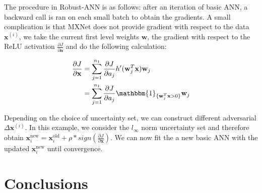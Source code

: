 \documentclass[twoside,12pt]{article}
\newcommand{\M}[1]{\boldsymbol{\mathbf{#1}}}
\begin{document}
The procedure in Robust-ANN is as follows: after an iteration of basic ANN, a backward call is ran on each small batch to obtain the gradients. A small complication is that \textsf{MXNet} does not provide gradient with respect to the data $\M x^{(i)}$, we take the current first level weights $\M w$, the gradient with respect to the ReLU activation $\frac{\partial J}{\partial \M a}$ and do the following calculation:


\begin{equation}
\begin{aligned}
\frac{\partial J}{\partial \M x} 
& = \sum_{j=1}^{n_1} \frac{\partial J}{\partial a_j} h'(\M w_j^T \M x) \M w_j\\
& = \sum_{j=1}^{n_1} \frac{\partial J}{\partial a_j} \mathbbm{1}_{\{\M w_j^T \M x > 0 \} } \M w_j
\end{aligned}
\end{equation}

Depending on the choice of uncertainty set, we can construct different adversarial $\Delta \M x^{(i)}$. In this example, we consider the $l_\infty$ norm uncertainty set and therefore obtain $\M x_i^{\textrm{new}} = \M x_i^{\textrm{old}} + \rho * sign(\frac{\partial J}{\partial \M x})$. We can now fit the a new basic ANN with the updated $\M x_i^{\textrm{new}}$ until convergence.



\section{Conclusions}




\end{document}
